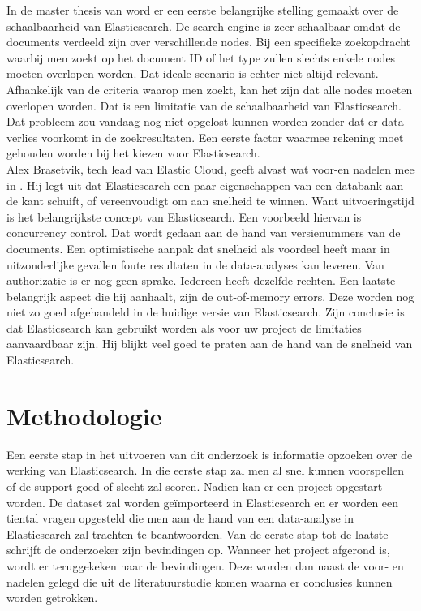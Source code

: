 \documentclass[fleqn,10pt]{voorstel}
\begin{document}
	In de master thesis van \textcite{Berglund2013} word er een eerste belangrijke stelling gemaakt over de schaalbaarheid van Elasticsearch. De search engine is zeer schaalbaar omdat de documents verdeeld zijn over verschillende nodes. Bij een specifieke zoekopdracht waarbij men zoekt op het document ID of het type zullen slechts enkele nodes moeten overlopen worden. Dat ideale scenario is echter niet altijd relevant. Afhankelijk van de criteria waarop men zoekt, kan het zijn dat alle nodes moeten overlopen worden. Dat is een limitatie van de schaalbaarheid van Elasticsearch. Dat probleem zou vandaag nog niet opgelost kunnen worden zonder dat er data-verlies voorkomt in de zoekresultaten. Een eerste factor waarmee rekening moet gehouden worden bij het kiezen voor Elasticsearch.
	\\
	Alex Brasetvik, tech lead van Elastic Cloud, geeft alvast wat voor-en nadelen mee in \textcite{Brasetvik2013}. Hij legt uit dat Elasticsearch een paar eigenschappen van een databank aan de kant schuift, of vereenvoudigt om aan snelheid te winnen. Want uitvoeringstijd is het belangrijkste concept van Elasticsearch. Een voorbeeld hiervan is concurrency control. Dat wordt gedaan aan de hand van versienummers van de documents. Een optimistische aanpak dat snelheid als voordeel heeft maar in uitzonderlijke gevallen foute resultaten in de data-analyses kan leveren. Van authorizatie is er nog geen sprake. Iedereen heeft dezelfde rechten. Een laatste belangrijk aspect die hij aanhaalt, zijn de out-of-memory errors. Deze worden nog niet zo goed afgehandeld in de huidige versie van Elasticsearch.
	Zijn conclusie is dat Elasticsearch kan gebruikt worden als voor uw project de limitaties aanvaardbaar zijn. Hij blijkt veel goed te praten aan de hand van de snelheid van Elasticsearch.
	
	
	
	\section{Methodologie}
	\label{sec:methodologie}
	
	Een eerste stap in het uitvoeren van dit onderzoek is informatie opzoeken over de werking van Elasticsearch. In die eerste stap zal men al snel kunnen voorspellen of de support goed of slecht zal scoren. Nadien kan er een project opgestart worden. De dataset zal worden geïmporteerd in Elasticsearch en er worden een tiental vragen opgesteld die men aan de hand van een data-analyse in Elasticsearch zal trachten te beantwoorden. Van de eerste stap tot de laatste schrijft de onderzoeker zijn bevindingen op. Wanneer het project afgerond is, wordt er teruggekeken naar de bevindingen. Deze worden dan naast de voor- en nadelen gelegd die uit de literatuurstudie komen waarna er conclusies kunnen worden getrokken.
		
\end{document}
